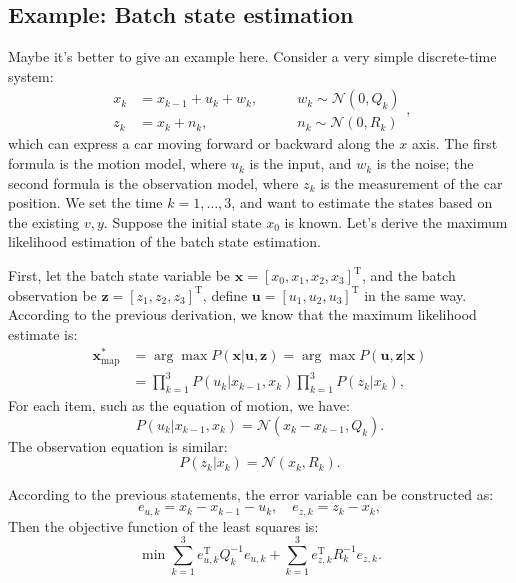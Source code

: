 \subsection{Example: Batch state estimation}
Maybe it's better to give an example here. Consider a very simple discrete-time system:
\begin{equation}
    \begin{array}{lll}
        {x_k} &= {x_{k-1}} + {u_k} + {w_k},&\qquad w_k \sim \mathcal{N}\left( {0,Q_k} \right)\\
        {z_k} &= {x_k} + {n_k},&\qquad {n_k}\sim \mathcal{N}\left( {0,R_k} \right)
    \end{array},
\end{equation}
which can express a car moving forward or backward along the $x$ axis. The first formula is the motion model, where $u_k$ is the input, and $w_k$ is the noise; the second formula is the observation model, where $z_k$ is the measurement of the car position. We set the time $k=1,\ldots,3$, and want to estimate the states based on the existing $v,y$. Suppose the initial state $x_0$ is known. Let's derive the maximum likelihood estimation of the batch state estimation.

First, let the batch state variable be $\mathbf{x} = [x_0,x_1, x_2, x_3]^\mathrm{T}$, and the batch observation be $\mathbf{z} = [z_1,z_2,z_3]^ \mathrm{T}$, define $\mathbf{u}=[u_1,u_2,u_3]^\mathrm{T}$ in the same way. According to the previous derivation, we know that the maximum likelihood estimate is:
\begin{equation}
    \begin{aligned}
        {\mathbf{x}_{\mathrm{map}}^*} &= \arg \max P(\mathbf{x}|\mathbf{u},\mathbf{z}) = \arg \max P( \mathbf{u},\mathbf{z}|\mathbf{x})\\
        &= \prod\limits_{k = 1}^3 {P({u_k}|{x_{k-1}},{x_k})\prod\limits_{k = 1}^3 {P\left( { {z_k}|{x_k}} \right)} },
    \end{aligned}
\end{equation}
For each item, such as the equation of motion, we have:
\begin{equation}
    P({u_k}|{x_{k-1}},{x_k}) = \mathcal{N}({x_k}-{x_{k-1}},{Q_k}).
\end{equation}
The observation equation is similar:
\begin{equation}
    P\left( {{z_k}|{x_k}} \right) = \mathcal{N}\left( {{x_k},{R_k}} \right).
\end{equation}

According to the previous statements, the error variable can be constructed as:
\begin{equation}
    {e_{u,k}} = {x_k}-{x_{k-1}}-{u_k}, \quad {e_{z,k}} = {z_k}-{x_k},
\end{equation}
Then the objective function of the least squares is:
\begin{equation}
    \min \sum\limits_{k = 1}^3 {e_{u,k}^\mathrm{T} Q_k^{-1}{e_{u,k}}} + \sum\limits_{k = 1 }^3 {e_{z,k}^\mathrm{T}{R^{-1}_k}{e_{z,k}}}.
\end{equation}

